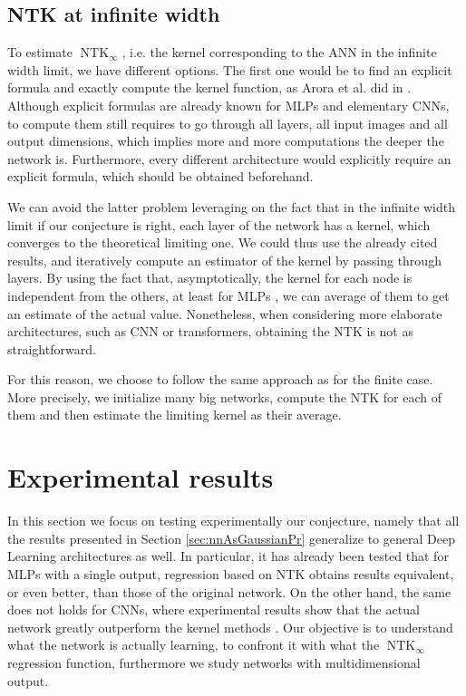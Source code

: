 \documentclass[11pt,notitlepage]{article}
\numberwithin{equation}{section}
\DeclareMathOperator{\NTK}{NTK}
\theoremstyle{remark}
\theoremstyle{definition}
\begin{document}
	\subsection{NTK at infinite width}\label{subsec:infinteImpl}
	To estimate $\NTK_\infty$, i.e. the kernel corresponding to the ANN in the infinite width limit, we have different options.
	The first one would be to find an explicit formula and exactly compute the kernel function, as Arora et al. did in \cite{arora2019exact}.
	Although explicit formulas are already known for MLPs and elementary CNNs, to compute them still requires to go through all layers, all input images and all output dimensions, which implies more and more computations the deeper the network is.
	Furthermore, every different architecture would explicitly require an explicit formula, which should be obtained beforehand.
	
	We can avoid the latter problem leveraging on the fact that in the infinite width limit if our conjecture is right, each layer of the network has a kernel, which converges to the theoretical limiting one.
	We could thus use the already cited results, and iteratively compute an estimator of the kernel by passing through layers.
	By using the fact that, asymptotically, the kernel for each node is independent from the others, at least for MLPs \cite{jacot2018neural}, we can average of them to get an estimate of the actual value.
	Nonetheless, when considering more elaborate architectures, such as CNN or transformers, obtaining the NTK is not as straightforward.
	
	For this reason, we choose to follow the same approach as for the finite case.
	More precisely, we initialize many big networks, compute the NTK for each of them and then estimate the limiting kernel as their average.
	
	\section{Experimental results}\label{sec:experiments}
	
	In this section we focus on testing experimentally our conjecture, namely that all the results presented in Section \ref{sec:nnAsGaussianPr} generalize to general Deep Learning architectures as well.
	In particular, it has already been tested that for MLPs with a single output, regression based on NTK obtains results equivalent, or even better, than those of the original network.
	On the other hand, the same does not holds for CNNs, where experimental results show that the actual network greatly outperform the kernel methods \cite{arora2019exact}.
	Our objective is to understand what the network is actually learning, to confront it with what the $\NTK_\infty$ regression function, furthermore we study networks with multidimensional output.
	
\end{document}
